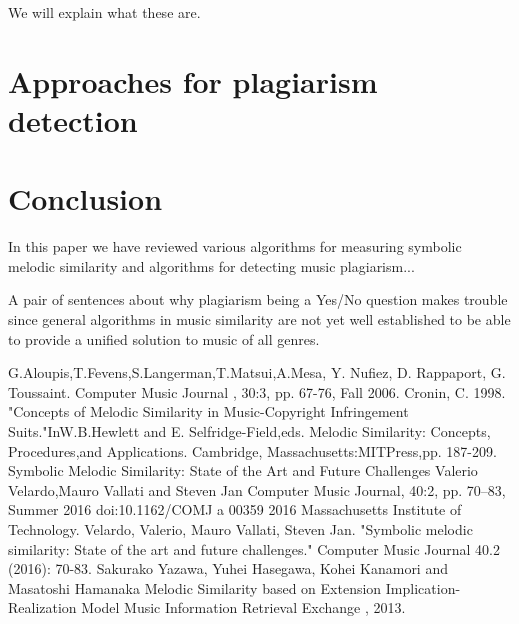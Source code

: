 \documentclass{article}
\begin{document}
					We will explain what these are.




	\section{Approaches for plagiarism detection}
			

	\section*{Conclusion}

		In this paper we have reviewed various algorithms for measuring symbolic melodic similarity and algorithms for detecting music plagiarism...

		A pair of sentences about why plagiarism being a Yes/No question makes trouble since general algorithms in music similarity are not yet well established to be able to provide a unified solution to music of all genres.


	\begin{thebibliography}{9}
		G.Aloupis,T.Fevens,S.Langerman,T.Matsui,A.Mesa, Y. Nufiez, D. Rappaport, G. Toussaint. Computer Music Journal , 30:3, pp. 67-76, Fall 2006.
		Cronin, C. 1998. "Concepts of Melodic Similarity in
		Music-Copyright Infringement Suits."InW.B.Hewlett and E. Selfridge-Field,eds. Melodic Similarity: Concepts, Procedures,and Applications. Cambridge, Massachusetts:MITPress,pp. 187-209.
		Symbolic Melodic Similarity: State of the Art and Future Challenges
		Valerio Velardo,Mauro Vallati and Steven Jan
		Computer Music Journal, 40:2, pp. 70–83, Summer 2016 doi:10.1162/COMJ a 00359
		2016 Massachusetts Institute of Technology.
		Velardo, Valerio, Mauro Vallati, Steven Jan.
		"Symbolic melodic similarity: State of the art and future challenges." Computer Music Journal 40.2 (2016): 70-83.
		Sakurako Yazawa, Yuhei Hasegawa, Kohei Kanamori and Masatoshi Hamanaka
		Melodic Similarity based on Extension Implication-Realization Model
		Music Information Retrieval Exchange , 2013.


	\end{thebibliography}
\end{document}
